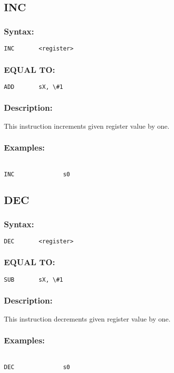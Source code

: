    \subsection{INC}
        \subsubsection{Syntax:}
            \verb'INC       <register>'

        \subsubsection{EQUAL TO:}
            \verb'ADD       sX, \#1'

        \subsubsection{Description:}
    This instruction increments given register value by one.
        \subsubsection{Examples:}
        {
            ~\\
            \usecodefont
            \verb'INC              s0'\\
        }

    \subsection{DEC}
        \subsubsection{Syntax:}
            \verb'DEC       <register>'

        \subsubsection{EQUAL TO:}
            \verb'SUB       sX, \#1'

        \subsubsection{Description:}
    This instruction decrements given register value by one.
        \subsubsection{Examples:}
        {
            ~\\
            \usecodefont
            \verb'DEC              s0'\\
        }

